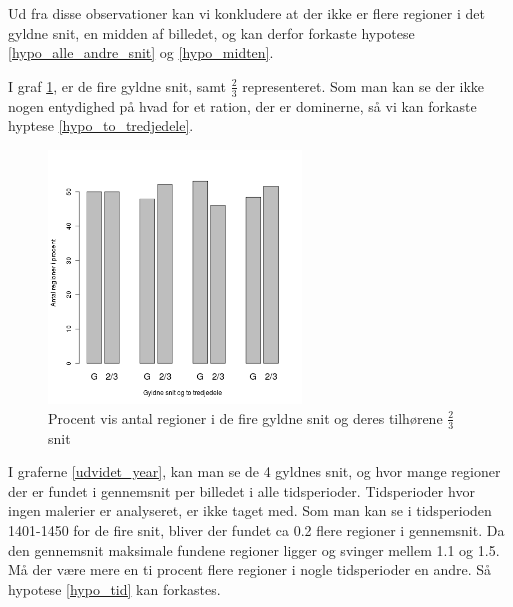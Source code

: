 {Ud fra disse observationer kan vi konkludere at der ikke er flere
regioner i det gyldne snit, en midden af billedet, og kan derfor
forkaste hypotese \ref{hypo_alle_andre_snit} og \ref{hypo_midten}.

I graf \ref{G_vs_to_trejedele_udvidet}, er de fire gyldne snit, samt
$\frac{2}{3}$ representeret. Som man kan se der ikke nogen entydighed på
hvad for et ration, der er dominerne, så vi kan forkaste hyptese
\ref{hypo_to_tredjedele}.

\begin{figure}[h!]
	\begin{center}
		\includegraphics[width=0.6\textwidth]{afsnit/resultater/billeder/G_vs_to_tredjedeleU.png}
	\end{center}
	\caption{Procent vis antal regioner i de fire gyldne snit og deres tilhørene $\frac{2}{3}$ snit}
	\label{G_vs_to_trejedele_udvidet}
\end{figure}

I graferne \ref{udvidet_year}, kan man se de 4 gyldnes snit, og hvor
mange regioner der er fundet i gennemsnit per billedet i alle
tidsperioder. Tidsperioder hvor ingen malerier er analyseret, er ikke
taget med. Som man kan se i tidsperioden 1401-1450 for de fire snit,
bliver der fundet ca 0.2 flere regioner i gennemsnit. Da den
gennemsnit maksimale fundene regioner ligger og svinger mellem 1.1 og
1.5. Må der være mere en ti procent flere regioner i nogle tidsperioder
en andre. Så hypotese \ref{hypo_tid} kan forkastes. 

}
